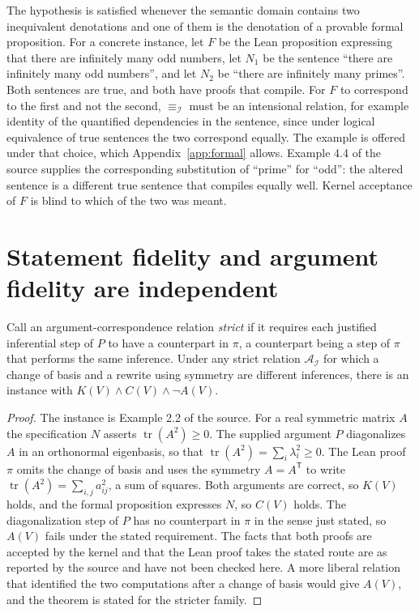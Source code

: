 The hypothesis is satisfied whenever the semantic domain contains two inequivalent denotations and one of them is the denotation of a provable formal proposition. For a concrete instance, let $F$ be the Lean proposition expressing that there are infinitely many odd numbers, let $N_1$ be the sentence ``there are infinitely many odd numbers'', and let $N_2$ be ``there are infinitely many primes''. Both sentences are true, and both have proofs that compile. For $F$ to correspond to the first and not the second, $\equiv_{\mathcal{I}}$ must be an intensional relation, for example identity of the quantified dependencies in the sentence, since under logical equivalence of true sentences the two correspond equally. The example is offered under that choice, which Appendix~\ref{app:formal} allows. Example 4.4 of the source supplies the corresponding substitution of ``prime'' for ``odd'': the altered sentence is a different true sentence that compiles equally well. Kernel acceptance of $F$ is blind to which of the two was meant.

\section{Statement fidelity and argument fidelity are independent}

\begin{theorem}[RV-002]
\label{thm:rv002}
Call an argument-correspondence relation \emph{strict} if it requires each justified inferential step of $P$ to have a counterpart in $\pi$, a counterpart being a step of $\pi$ that performs the same inference. Under any strict relation $\mathcal{A}_{\mathcal{I}}$ for which a change of basis and a rewrite using symmetry are different inferences, there is an instance with $K(V) \wedge C(V) \wedge \neg A(V)$.
\end{theorem}

\begin{proof}
The instance is Example 2.2 of the source. For a real symmetric matrix $A$ the specification $N$ asserts $\operatorname{tr}(A^2) \ge 0$. The supplied argument $P$ diagonalizes $A$ in an orthonormal eigenbasis, so that $\operatorname{tr}(A^2) = \sum_i \lambda_i^2 \ge 0$. The Lean proof $\pi$ omits the change of basis and uses the symmetry $A = A^{\mathsf{T}}$ to write $\operatorname{tr}(A^2) = \sum_{i,j} a_{ij}^2$, a sum of squares. Both arguments are correct, so $K(V)$ holds, and the formal proposition expresses $N$, so $C(V)$ holds. The diagonalization step of $P$ has no counterpart in $\pi$ in the sense just stated, so $A(V)$ fails under the stated requirement. The facts that both proofs are accepted by the kernel and that the Lean proof takes the stated route are as reported by the source and have not been checked here. A more liberal relation that identified the two computations after a change of basis would give $A(V)$, and the theorem is stated for the stricter family.
\end{proof}

